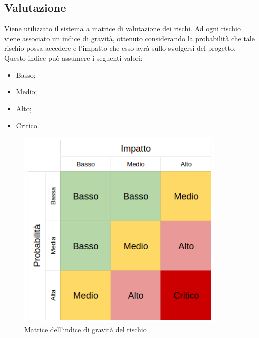 \documentclass[../piano-di-progetto.tex]{subfiles}
\begin{document}
\subsection{Valutazione}
Viene utilizzato il sistema a matrice di valutazione dei rischi. Ad ogni rischio viene associato un indice di gravità, ottenuto considerando la probabilità che tale rischio possa accedere e l'impatto che esso avrà sullo svolgersi del progetto. Questo indice può assumere i seguenti valori:
\begin{itemize}
    \item Basso;
    \item Medio;
    \item Alto;
    \item Critico.
\end{itemize}
\begin{figure}[H]
	\centering
	\includegraphics[width=10cm]{img/matrice-rischio.png}
	\caption{Matrice dell'indice di gravità del rischio}
	\label{fig:matrice-rischio}
  \end{figure}
\end{document}
